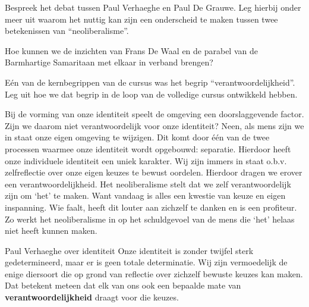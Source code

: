 \documentclass[main.tex]{subfiles}
\begin{document}
\begin{examenvraag}
    \begin{vraag}
        Bespreek het debat tussen Paul Verhaeghe en Paul De Grauwe. Leg hierbij onder meer uit waarom het nuttig kan zijn een onderscheid te maken tussen twee betekenissen van “neoliberalisme”.
    \end{vraag}

    \begin{antwoord}
    \end{antwoord}
\end{examenvraag}


\begin{examenvraag}
    \begin{vraag}
        Hoe kunnen we de inzichten van Frans De Waal en de parabel van de Barmhartige Samaritaan met elkaar in verband brengen?
    \end{vraag}

    \begin{antwoord}
    \end{antwoord}
\end{examenvraag}


\begin{examenvraag}
    \begin{vraag}
        Eén van de kernbegrippen van de cursus was het begrip “verantwoordelijkheid”. Leg uit hoe we dat begrip in de loop van de volledige cursus ontwikkeld hebben.
    \end{vraag}

    \begin{antwoord}
	Bij de vorming van onze identiteit speelt de omgeving een doorslaggevende factor.‭ ‬Zijn we 
	daarom niet verantwoordelijk voor onze identiteit‭? ‬Neen,‭ ‬als mens zijn we in staat onze eigen 
	omgeving te wijzigen.‭ ‬Dit komt door één van de‭ ‬twee processen waarmee onze identiteit wordt 
	opgebouwd:‭ ‬separatie.‭ ‬Hierdoor heeft onze individuele identiteit een uniek karakter.‭ ‬Wij zijn 
	immers in staat o.b.v.‭ ‬zelfreflectie over onze eigen keuzes te bewust oordelen.‭ ‬Hierdoor dragen 
	we erover een verantwoordelijkheid.‭
	‬Het neoliberalisme stelt dat we zelf verantwoordelijk zijn om‭ ‬‘het‭’‬ te maken.‭ ‬Want vandaag is 
	alles een kwestie van keuze en eigen inspanning.‭ ‬Wie faalt,‭ ‬heeft dit louter aan zichzelf te 
	danken en is een profiteur.‭ ‬Zo werkt het neoliberalisme in op het schuldgevoel van de mens die‭ 
	‬‘het‭’‬ helaas niet heeft kunnen maken.
    \end{antwoord}
    \begin{citaat}{Paul Verhaeghe over identiteit}
    Onze
identiteit is zonder twijfel sterk gedetermineerd, maar er is geen totale determinatie. Wij zijn
vermoedelijk de enige diersoort die op grond van reflectie over zichzelf bewuste keuzes kan maken.
Dat betekent meteen dat elk van ons ook een bepaalde mate van \textbf{verantwoordelijkheid} draagt voor die
keuzes. 
    \end{citaat}
\end{examenvraag}
\end{document}
